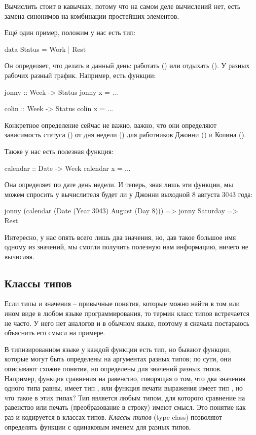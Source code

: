 Вычислить стоит в кавычках, потому что на самом деле
вычислений нет, есть замена синонимов на комбинации простейших
элементов.


Ещё один пример, положим у нас есть тип:

\begin{code}
data Status = Work | Rest
\end{code}

Он определяет, что делать в данный день: работать ()
или отдыхать (). У разных рабочих разный график.
Например, есть функции:

\begin{code}
jonny :: Week -> Status
jonny x = ...

colin :: Week -> Status
colin x = ...
\end{code}

Конкретное определение сейчас не важно, важно, что они определяют
зависимость статуса () от дня недели () для 
работников Джонни () и Колина (). 

Также у нас есть полезная функция:

\begin{code}
calendar :: Date -> Week
calendar x = ...
\end{code}

Она определяет по дате день недели. И теперь, зная лишь
эти функции, мы можем спросить у вычислителя будет ли
у Джонни выходной 8 августа 3043 года:

\begin{code}
jonny (calendar (Date (Year 3043) August (Day 8)))
=> jonny Saturday
=> Rest
\end{code}

Интересно, у нас опять всего лишь два значения, 
но, дав такое большое имя одному из значений,
мы смогли получить полезную нам информацию,
ничего не вычисляя.


\subsection{Классы типов}

Если типы и значения -- привычные понятия, которые можно найти
в том или ином виде в любом языке программирования, то термин 
класс типов встречается не часто. У него нет аналогов и в 
обычном языке, поэтому я сначала постараюсь объяснить 
его смысл на примере. 

В типизированном языке у каждой 
функции есть тип, но бывают функции, которые могут быть 
определены на аргументах разных типов; по сути, они описывают
схожие понятия, но определены для значений разных типов.
Например, функция сравнения на равенство, говорящая о том, что два значения 
одного типа  равны, имеет тип , 
или функция печати выражения имеет тип ,
но что такое  в этих типах? Тип  является
любым типом, для которого сравнение на равенство или 
печать (преобразование в строку) имеют смысл. Это
понятие как раз и кодируется в классах типов. 
 \emph{Классы типов} (type class)
позволяют определять функции с одинаковым
именем для разных типов. 

